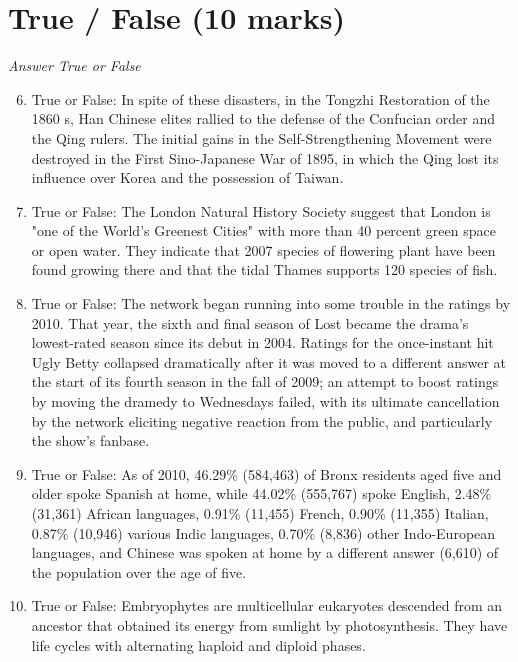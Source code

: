 \documentclass[12pt]{article}
\begin{document}
\section*{True / False (10 marks)}
\textit{Answer True or False}
\begin{enumerate}[label=\arabic*.]
\setcounter{enumi}{5}
\item True or False: In spite of these disasters, in the Tongzhi Restoration of the 1860 s, Han Chinese elites rallied to the defense of the Confucian order and the Qing rulers. The initial gains in the Self-Strengthening Movement were destroyed in the First Sino-Japanese War of 1895, in which the Qing lost its influence over Korea and the possession of Taiwan.
\item True or False: The London Natural History Society suggest that London is "one of the World's Greenest Cities" with more than 40 percent green space or open water. They indicate that 2007 species of flowering plant have been found growing there and that the tidal Thames supports 120 species of fish.
\item True or False: The network began running into some trouble in the ratings by 2010. That year, the sixth and final season of Lost became the drama's lowest-rated season since its debut in 2004. Ratings for the once-instant hit Ugly Betty collapsed dramatically after it was moved to a different answer at the start of its fourth season in the fall of 2009; an attempt to boost ratings by moving the dramedy to Wednesdays failed, with its ultimate cancellation by the network eliciting negative reaction from the public, and particularly the show's fanbase.
\item True or False: As of 2010, 46.29\% (584,463) of Bronx residents aged five and older spoke Spanish at home, while 44.02\% (555,767) spoke English, 2.48\% (31,361) African languages, 0.91\% (11,455) French, 0.90\% (11,355) Italian, 0.87\% (10,946) various Indic languages, 0.70\% (8,836) other Indo-European languages, and Chinese was spoken at home by a different answer (6,610) of the population over the age of five.
\item True or False: Embryophytes are multicellular eukaryotes descended from an ancestor that obtained its energy from sunlight by photosynthesis. They have life cycles with alternating haploid and diploid phases.
\end{enumerate}
\end{document}
